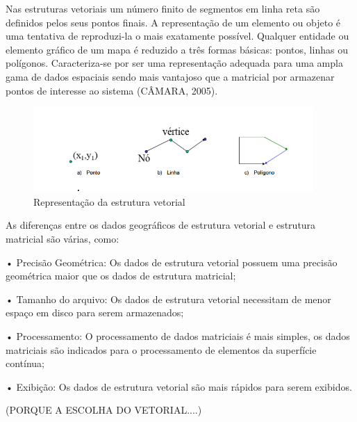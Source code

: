 \documentclass[
	12pt,				%
    oneside,			%
	a4paper,			%
	english,			%
	french,				%
	spanish,			%
	brazil,				%
	]{abntex2}
\begin{document}
Nas estruturas vetoriais um número finito de segmentos em linha reta são definidos pelos seus pontos finais. A representação de um elemento ou objeto é uma tentativa de reproduzi-la o mais exatamente possível. Qualquer entidade ou elemento gráfico de um mapa é reduzido a três formas básicas: pontos, linhas ou polígonos. Caracteriza-se por ser uma representação adequada para uma ampla gama de dados espaciais sendo mais vantajoso que a matricial por armazenar pontos de interesse ao sistema (CÂMARA, 2005).

\begin{figure} [H] 
\label{figura1} 
\caption{Representação da estrutura vetorial}
\includegraphics[width=0.95\textwidth]{vetorial.png} %
\end{figure}

As diferenças entre os dados geográficos de estrutura vetorial e estrutura matricial são várias, como:

•	Precisão Geométrica: Os dados de estrutura vetorial possuem uma precisão geométrica maior que os dados de estrutura matricial;

•	Tamanho do arquivo: Os dados de estrutura vetorial necessitam de menor espaço em disco para serem armazenados;

•	Processamento: O processamento de dados matriciais é mais simples, os dados matriciais são indicados para o processamento de elementos da superfície contínua;

•	Exibição: Os dados de estrutura vetorial são mais rápidos para serem exibidos.

(PORQUE A ESCOLHA DO VETORIAL....)
\end{document}
